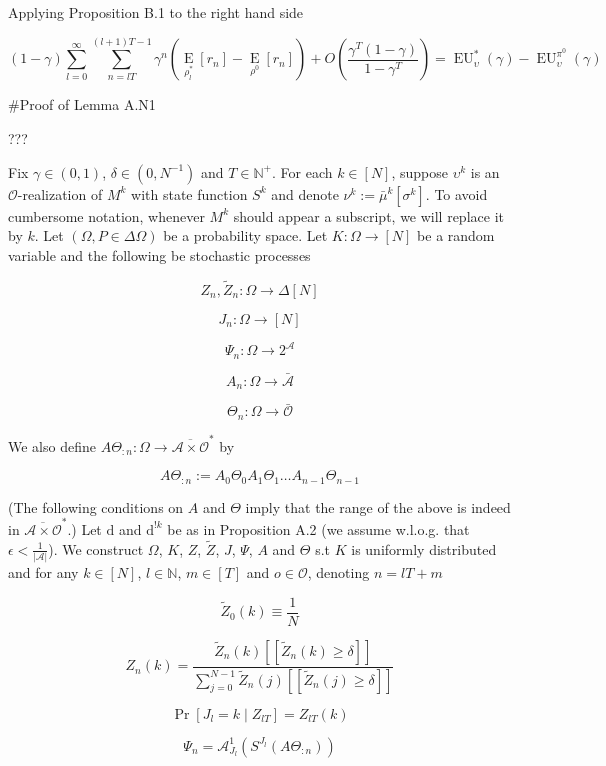 \documentclass[a4paper]{article}
\newcommand{\Comment}[1]{}
\newcommand{\AP}[1]{\left(#1\right)}
\newcommand{\AB}[1]{\left[#1\right]}
\newcommand{\Ea}[2]{\underset{#1}{\operatorname{E}}\AB{#2}}
\newcommand{\D}{\mathrm{d}}
\newcommand{\Nats}{\mathbb{N}}
\newcommand{\Abs}[1]{\left\vert #1 \right\vert}
\newcommand{\Ob}{\mathcal{O}}
\newcommand{\A}{\mathcal{A}}
\newcommand{\Ado}{\bar{\Ob}}
\newcommand{\Ada}{\bar{\A}}
\newcommand{\Adao}{\overline{\A \times \Ob}}
\newcommand{\Adfh}{\Adao^*}
\newcommand{\EU}{\operatorname{EU}}
\newcommand{\F}{\mathcal{F}}
\newcommand{\Z}{Z}
\newcommand{\J}{J}
\begin{document}
Applying Proposition B.1 to the right hand side

$$(1-\gamma)\sum_{l=0}^\infty\sum_{n=lT}^{(l+1)T-1} {\gamma^n\AP{\Ea{\rho^*_l}{r_n}-\Ea{\rho^0}{r_n}}} + O\AP{\frac{\gamma^T(1-\gamma)}{1-\gamma^{T}}}= \EU_{\upsilon}^{*}(\gamma) - \EU_{\upsilon}^{\pi^0}(\gamma)$$

\#Proof of Lemma A.N1

???

Fix $\gamma \in (0,1)$, $\delta\in\left(0,N^{-1}\right)$ and $T \in \Nats^+$. For each $k \in [N]$, suppose $\upsilon^k$ is an $\Ob$-realization of $M^k$ with state function $S^k$ and denote $\nu^k:=\bar{\mu}^k\left[\sigma^k\right]$. To avoid cumbersome notation, whenever $M^k$ should appear a subscript, we will replace it by $k$. Let $(\Omega,P \in \Delta\Omega)$ be a probability space\Comment{ and $\{\F_n \subseteq 2^\Omega\}_{n \in \Nats \sqcup \{-1\}}$ a filtration of $\Omega$}. Let $K: \Omega \rightarrow [N]$ be \Comment{measurable w.r.t. $\F_{-1}$}a random variable and the following be stochastic processes\Comment{ adapted to $\F$}

$$\Z_n,\tilde{\Z}_n: \Omega \rightarrow \Delta[N]$$

$$\J_n: \Omega \rightarrow [N]$$

$$\Psi_n: \Omega \rightarrow 2^\A$$

$$A_n: \Omega \rightarrow \Ada$$

$$\Theta_n: \Omega \rightarrow \Ado$$

We also define $A\Theta_{:n}: \Omega \rightarrow \Adfh$ by

$$A\Theta_{:n}:= A_0\Theta_0A_1\Theta_1 \ldots A_{n-1}\Theta_{n-1}$$

(The following conditions on $A$ and $\Theta$ imply that the range of the above is indeed in $\Adfh$.) Let $\D$ and $\D^{!k}$ be as in Proposition A.2 (we assume w.l.o.g. that $\epsilon < \frac{1}{\Abs{\A}}$). We construct $\Omega$\Comment{, $\F$}, $K$, $\Z$, $\tilde{\Z}$, $\J$, $\Psi$, $A$ and $\Theta$ s.t $K$ is uniformly distributed and for any $k \in [N]$, $l \in \Nats$, $m \in [T]$ and $o \in \Ob$, denoting $n = lT+m$

$$\tilde{\Z}_0(k)\equiv\frac{1}{N}$$

$$\Z_{n}(k) = \frac{\tilde{\Z}_{n}(k)[[\tilde{\Z}_{n}(k) \geq \delta]] }{\sum_{j = 0}^{N-1}\tilde{\Z}_{n}(j)[[\tilde{\Z}_{n}(j) \geq \delta]]}$$

$$\Pr\left[\J_{l} = k \mid Z_{lT}\right] = \Z_{lT}\left(k\right)$$

$$\Psi_{n} = \A^1_{\J_l}\left(S^{\J_l}(A\Theta_{:n})\right)$$
\end{document}
